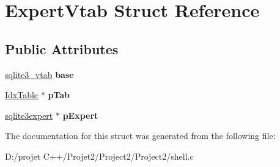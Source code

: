 \hypertarget{struct_expert_vtab}{}\section{Expert\+Vtab Struct Reference}
\label{struct_expert_vtab}
\subsection*{Public Attributes}
\begin{DoxyCompactItemize}
\item 
\mbox{\label{struct_expert_vtab_a0cd9cd0060f192bd979d67e1e70ab581}} 
\mbox{\hyperlink{structsqlite3__vtab}{sqlite3\+\_\+vtab}} {\bfseries base}
\item 
\mbox{\label{struct_expert_vtab_ac595e2ef803422f1f0bc3f4970fad526}} 
\mbox{\hyperlink{struct_idx_table}{Idx\+Table}} $\ast$ {\bfseries p\+Tab}
\item 
\mbox{\label{struct_expert_vtab_af11c06e3df509f8920e8d1e37f831910}} 
\mbox{\hyperlink{structsqlite3expert}{sqlite3expert}} $\ast$ {\bfseries p\+Expert}
\end{DoxyCompactItemize}


The documentation for this struct was generated from the following file\+:\begin{DoxyCompactItemize}
\item 
D\+:/projet C++/\+Projet2/\+Project2/\+Project2/shell.\+c\end{DoxyCompactItemize}
